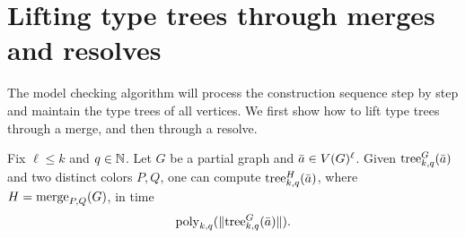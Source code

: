 \section{Lifting type trees through merges and resolves}
\label{sec:merge-resolve}
The model checking algorithm will process 
the construction sequence step by step and maintain the type trees of all vertices.
We first show how to lift type trees through a merge, and then through a resolve.

\begin{lemma}\label{lem:merge-lift}
Fix $\ell\le k$ and $q\in\N$.
Let $G$ be a partial graph and $\tup a\in V(G)^\ell$.
Given
$\tree^G_{k,q}(\tup a)$ and two distinct colors $P,Q$, one can compute
 $\tree^{H}_{k,q}(\tup a)$, where $H=\merge PQ(G)$,
in time
\[
\poly_{k,q}(\size{\tree^G_{k,q}(\tup a)}).
\]
\end{lemma}
